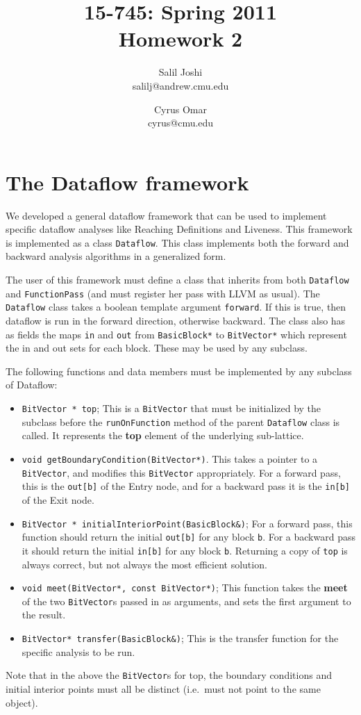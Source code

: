 \documentclass[12pt]{article}
\title{{\small 15-745: Spring 2011}\\Homework 2}
\author{Salil Joshi\\
salilj@andrew.cmu.edu
\and
Cyrus Omar\\
cyrus@cmu.edu
}
\date{}                                           %
\begin{document}
\maketitle
\section{The Dataflow framework}
We developed a general dataflow framework that can be used to implement specific dataflow analyses like Reaching Definitions and Liveness. This framework is implemented as a class \verb|Dataflow|. This class implements both the forward and backward analysis algorithms in a generalized form.

The user of this framework must define a class that inherits from both \verb|Dataflow| and \verb|FunctionPass| (and must register her pass with LLVM as usual). The \verb|Dataflow| class takes a boolean template argument \verb|forward|. If this is true, then dataflow is run in the forward direction, otherwise backward. The class also has as fields the maps \verb|in| and \verb|out| from \verb|BasicBlock*| to \verb|BitVector*| which represent the in and out sets for each block. These may be used by any subclass.

The following functions and data members must be implemented by any subclass of Dataflow:
\begin{itemize}
\item \verb|BitVector * top|; This is a \verb|BitVector| that must be initialized by the subclass before the \verb|runOnFunction| method of the parent \verb|Dataflow| class is called. It represents the \textbf{top} element of the underlying sub-lattice.
\item \verb|void getBoundaryCondition(BitVector*)|. This takes a pointer to a \verb|BitVector|, and modifies this \verb|BitVector| appropriately. For a forward pass, this is the \verb|out[b]| of the Entry node, and for a backward pass it is the \verb|in[b]| of the Exit node.
\item \verb|BitVector * initialInteriorPoint(BasicBlock&)|; For a forward pass, this function should return the initial \verb|out[b]| for any block \verb|b|. For a backward pass it should return the initial \verb|in[b]| for any block \verb|b|. Returning a copy of \verb|top| is always correct, but not always the most efficient solution.

\item \verb|void meet(BitVector*, const BitVector*)|; This function takes the \textbf{meet} of the two \verb|BitVector|s passed in as arguments, and sets the first argument to the result.

\item \verb|BitVector* transfer(BasicBlock&)|; This is the transfer function for the specific analysis to be run.
\end{itemize}
Note that in the above the \verb|BitVector|s for top, the boundary conditions and initial interior points must all be distinct (i.e.\ must not point to the same object).
\end{document}
